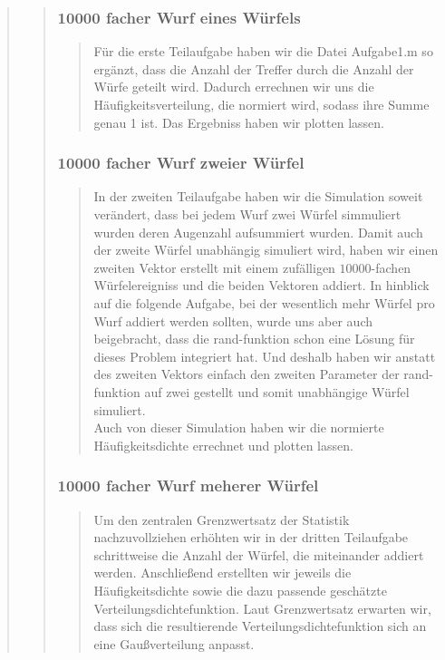 \begin{quote}
\begin{quote}
        \subsubsection{10000 facher  Wurf eines Würfels}
        \begin{quote}
            Für die erste Teilaufgabe haben wir die Datei Aufgabe1.m so ergänzt, dass die Anzahl der Treffer durch die
            Anzahl der Würfe geteilt wird. Dadurch errechnen wir uns die
            Häufigkeitsverteilung, die normiert wird, sodass ihre Summe genau 1
            ist.
            Das Ergebniss haben wir plotten lassen.

        \end{quote}
        
        \subsubsection{10000 facher Wurf zweier Würfel}
        \begin{quote}
            In der zweiten Teilaufgabe haben wir die Simulation soweit verändert, dass bei jedem Wurf zwei Würfel
            simmuliert wurden deren Augenzahl aufsummiert wurden. Damit auch der
            zweite Würfel unabhängig simuliert wird, haben wir einen zweiten
            Vektor erstellt mit einem zufälligen $10000$-fachen Würfelereigniss und die beiden Vektoren addiert. 
            In hinblick auf die folgende Aufgabe, bei der wesentlich mehr Würfel
            pro Wurf addiert werden sollten, wurde uns aber auch beigebracht,
            dass die rand-funktion schon eine Lösung für dieses Problem
            integriert hat. Und deshalb haben wir anstatt des zweiten Vektors einfach den zweiten Parameter der rand-funktion 
            auf zwei gestellt und somit unabhängige Würfel simuliert.\\
            Auch von dieser Simulation haben wir die normierte Häufigkeitsdichte errechnet und
            plotten lassen.\\
        \end{quote}
        
        \subsubsection{10000 facher Wurf meherer Würfel}
        \begin{quote}
            Um den zentralen Grenzwertsatz der Statistik nachzuvollziehen
            erhöhten wir in der dritten Teilaufgabe schrittweise die Anzahl der Würfel, die miteinander addiert werden. 
            Anschließend erstellten wir jeweils die
            Häufigkeitsdichte sowie die dazu passende geschätzte
            Verteilungsdichtefunktion.
            Laut Grenzwertsatz erwarten wir, dass sich die resultierende Verteilungsdichtefunktion sich an eine Gaußverteilung anpasst.
        \end{quote}        
    \end{quote}
	

\end{quote}

